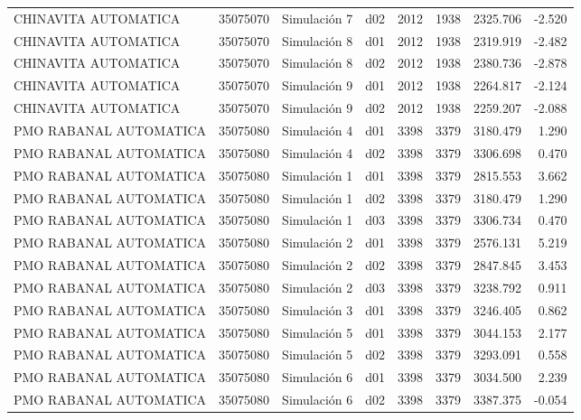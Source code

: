 \begin{landscape}
\begin{longtable}{lrlp{2cm}p{2cm}p{3cm}p{2cm}r}
    CHINAVITA AUTOMATICA &  35075070 &   Simulación 7 &   d02 &      2012 &     1938 &  2325.706 &    -2.520 \\
    CHINAVITA AUTOMATICA &  35075070 &   Simulación 8 &   d01 &      2012 &     1938 &  2319.919 &    -2.482 \\
    CHINAVITA AUTOMATICA &  35075070 &   Simulación 8 &   d02 &      2012 &     1938 &  2380.736 &    -2.878 \\
    CHINAVITA AUTOMATICA &  35075070 &   Simulación 9 &   d01 &      2012 &     1938 &  2264.817 &    -2.124 \\
    CHINAVITA AUTOMATICA &  35075070 &   Simulación 9 &   d02 &      2012 &     1938 &  2259.207 &    -2.088 \\
  PMO RABANAL AUTOMATICA &  35075080 &   Simulación 4 &   d01 &      3398 &     3379 &  3180.479 &     1.290 \\
  PMO RABANAL AUTOMATICA &  35075080 &   Simulación 4 &   d02 &      3398 &     3379 &  3306.698 &     0.470 \\
  PMO RABANAL AUTOMATICA &  35075080 &   Simulación 1 &   d01 &      3398 &     3379 &  2815.553 &     3.662 \\
  PMO RABANAL AUTOMATICA &  35075080 &   Simulación 1 &   d02 &      3398 &     3379 &  3180.479 &     1.290 \\
  PMO RABANAL AUTOMATICA &  35075080 &   Simulación 1 &   d03 &      3398 &     3379 &  3306.734 &     0.470 \\
  PMO RABANAL AUTOMATICA &  35075080 &   Simulación 2 &   d01 &      3398 &     3379 &  2576.131 &     5.219 \\
  PMO RABANAL AUTOMATICA &  35075080 &   Simulación 2 &   d02 &      3398 &     3379 &  2847.845 &     3.453 \\
  PMO RABANAL AUTOMATICA &  35075080 &   Simulación 2 &   d03 &      3398 &     3379 &  3238.792 &     0.911 \\
  PMO RABANAL AUTOMATICA &  35075080 &   Simulación 3 &   d01 &      3398 &     3379 &  3246.405 &     0.862 \\
  PMO RABANAL AUTOMATICA &  35075080 &   Simulación 5 &   d01 &      3398 &     3379 &  3044.153 &     2.177 \\
  PMO RABANAL AUTOMATICA &  35075080 &   Simulación 5 &   d02 &      3398 &     3379 &  3293.091 &     0.558 \\
  PMO RABANAL AUTOMATICA &  35075080 &   Simulación 6 &   d01 &      3398 &     3379 &  3034.500 &     2.239 \\
  PMO RABANAL AUTOMATICA &  35075080 &   Simulación 6 &   d02 &      3398 &     3379 &  3387.375 &    -0.054 \\

\end{longtable}
\end{landscape}
